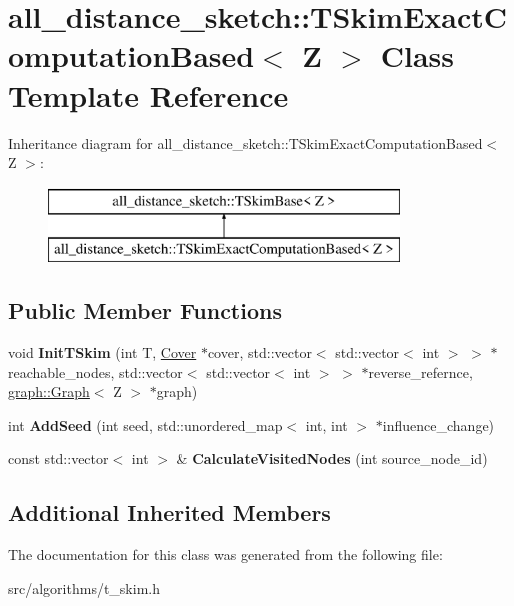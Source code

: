 \hypertarget{classall__distance__sketch_1_1TSkimExactComputationBased}{}\section{all\+\_\+distance\+\_\+sketch\+:\+:T\+Skim\+Exact\+Computation\+Based$<$ Z $>$ Class Template Reference}
\label{classall__distance__sketch_1_1TSkimExactComputationBased}
Inheritance diagram for all\+\_\+distance\+\_\+sketch\+:\+:T\+Skim\+Exact\+Computation\+Based$<$ Z $>$\+:\begin{figure}[H]
\begin{center}
\leavevmode
\includegraphics[height=2.000000cm]{classall__distance__sketch_1_1TSkimExactComputationBased}
\end{center}
\end{figure}
\subsection*{Public Member Functions}
\begin{DoxyCompactItemize}
\item 
\hypertarget{classall__distance__sketch_1_1TSkimExactComputationBased_a0f07f4abbb824cec655303b7fa0aa5ab}{}void {\bfseries Init\+T\+Skim} (int T, \hyperlink{classall__distance__sketch_1_1Cover}{Cover} $\ast$cover, std\+::vector$<$ std\+::vector$<$ int $>$ $>$ $\ast$reachable\+\_\+nodes, std\+::vector$<$ std\+::vector$<$ int $>$ $>$ $\ast$reverse\+\_\+refernce, \hyperlink{classall__distance__sketch_1_1graph_1_1Graph}{graph\+::\+Graph}$<$ Z $>$ $\ast$graph)\label{classall__distance__sketch_1_1TSkimExactComputationBased_a0f07f4abbb824cec655303b7fa0aa5ab}

\item 
\hypertarget{classall__distance__sketch_1_1TSkimExactComputationBased_a2a831f31d19d5227ca72f9fe516798be}{}int {\bfseries Add\+Seed} (int seed, std\+::unordered\+\_\+map$<$ int, int $>$ $\ast$influence\+\_\+change)\label{classall__distance__sketch_1_1TSkimExactComputationBased_a2a831f31d19d5227ca72f9fe516798be}

\item 
\hypertarget{classall__distance__sketch_1_1TSkimExactComputationBased_a0c18ab99436253fc7377b27a3203d876}{}const std\+::vector$<$ int $>$ \& {\bfseries Calculate\+Visited\+Nodes} (int source\+\_\+node\+\_\+id)\label{classall__distance__sketch_1_1TSkimExactComputationBased_a0c18ab99436253fc7377b27a3203d876}

\end{DoxyCompactItemize}
\subsection*{Additional Inherited Members}


The documentation for this class was generated from the following file\+:\begin{DoxyCompactItemize}
\item 
src/algorithms/t\+\_\+skim.\+h\end{DoxyCompactItemize}
